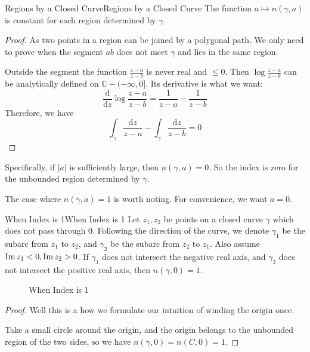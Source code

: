 \documentclass[../main.tex]{subfiles}
\begin{document}
\begin{theorem}{Regions by a Closed Curve}{Regions by a Closed Curve}
The function $a \mapsto n(\gamma,a)$ is constant for each region determined by $\gamma$.
\end{theorem}
\begin{proof}
As two points in a region can be joined by a polygonal path. We only need to prove when the segment $ab$ does not meet $\gamma$ and lies in the same region.

Outside the segment the function $\displaystyle \frac{z-a}{z-b}$ is never real and $\leq 0$. Then $\displaystyle \log \frac{z-a}{z-b}$ can be analytically defined on $\mathbb{C}-(-\infty ,0]$. Its derivative is what we want:
\begin{equation*}
	\frac{\mathrm{d}}{\mathrm{d} z} \log \frac{z-a}{z-b} = \frac{1}{z-a} - \frac{1}{z-b}
\end{equation*}
Therefore, we have
\begin{equation*}
	\int_{\gamma} \frac{\mathrm{d} z}{z-a} - \int_{\gamma} \frac{\mathrm{d} z}{z-b} = 0
\end{equation*}
\end{proof}

Specifically, if $\left|a\right|$ is sufficiently large, then $n(\gamma,a) = 0$. So the index is zero for the unbounded region determined by $\gamma$.

The case where $n(\gamma,a)=1$ is worth noting. For convenience, we want $a=0$.

\begin{lemma}{When Index is 1}{When Index is 1}
Let $z_1,z_2$ be points on a closed curve $\gamma$ which does not pass through $0$. Following the direction of the curve, we denote $\gamma_1$ be the subarc from $z_1$ to $z_2$, and $\gamma_2$ be the subarc from $z_2$ to $z_1$. Also assume $\operatorname{Im} z_1 <0,\operatorname{Im} z_2>0$. If $\gamma_1$ does not intersect the negative real axis, and $\gamma_2$ does not intersect the positive real axis, then $n(\gamma,0)=1$.
\end{lemma}

\begin{figure}[ht]
    \centering
    \caption{When Index is 1}
    \label{fig:when-index-is-1}
\end{figure}
\begin{proof}
Well this is a how we formulate our intuition of winding the origin once.

Take a small circle around the origin, and the origin belongs to the unbounded region of the two sides, so we have $n(\gamma,0) = n(C,0)=1$.
\end{proof}
\end{document}
